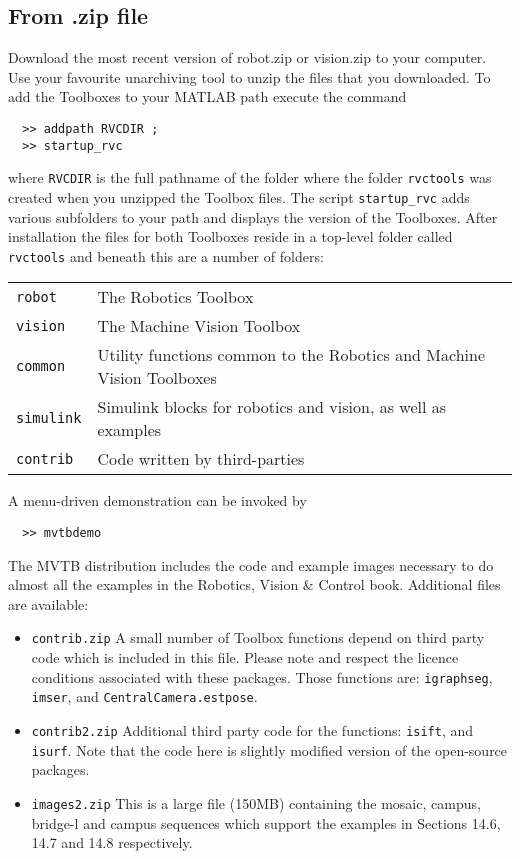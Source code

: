 \documentclass[a4paper,twoside]{report}
\begin{document}
\subsection{From .zip file}
Download the most recent version of robot.zip or vision.zip to your computer. Use your favourite unarchiving tool to unzip the files that you downloaded.
To add the Toolboxes to your MATLAB path execute the command
\begin{verbatim}
  >> addpath RVCDIR ;
  >> startup_rvc
\end{verbatim}
where \texttt{RVCDIR} is the full pathname of the folder where the folder \texttt{rvctools} was created when you unzipped the Toolbox files. The script \texttt{startup\_rvc} adds various subfolders to your path and displays the version of the Toolboxes.
After installation the files for both Toolboxes reside in a top-level folder called \texttt{rvctools} and beneath this are a number of folders:

\begin{tabular}{ll}
\texttt{robot} & The Robotics Toolbox \\
\texttt{vision} & The Machine Vision Toolbox\\
\texttt{common} & Utility functions common to the Robotics and Machine Vision Toolboxes\\
\texttt{simulink}  & Simulink blocks for robotics and vision, as well as examples \\
\texttt{contrib} & Code written by third-parties\\
\end{tabular}


A menu-driven demonstration can be invoked by 
\begin{verbatim}
  >> mvtbdemo
\end{verbatim}

The MVTB distribution includes the code and example images necessary to do almost all the examples in the Robotics, Vision \& Control
book.  Additional files are available:
\begin{itemize}
\item \texttt{contrib.zip} A small number of Toolbox functions depend on third party code which is included in this file. Please note and respect the licence conditions associated with these packages.
Those functions are: 
\texttt{igraphseg},
\texttt{imser}, and
\texttt{CentralCamera.estpose}.
\item \texttt{contrib2.zip} Additional third party code for
the functions: \texttt{isift}, and \texttt{isurf}.
Note that the code here is slightly modified version of the open-source
packages.
\item \texttt{images2.zip} This is a large file (150MB) containing the mosaic, campus, bridge-l and campus sequences which support the examples in Sections 14.6, 14.7 and 14.8 respectively.
\end{itemize}
\end{document}
